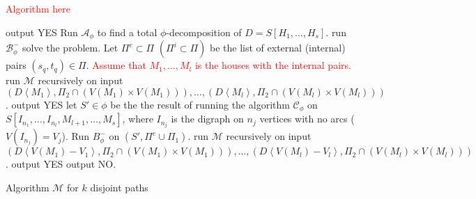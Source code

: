 \textcolor{red}{Algorithm here}
\begin{algorithm}
    \begin{algorithmic}[1]
        \IF{$\Pi=\emptyset$}
            \STATE output YES
        \ENDIF
        \STATE Run $\mathcal{A}_{\phi}$ to find a total $\phi$-decomposition of $D=S[H_1,\dots,H_s]$.
            \STATE run $\mathcal{B}^-_{\phi}$ solve the problem.
        \ENDIF
        \STATE Let $\Pi^e\subset \Pi$ $(\Pi^i\subset \Pi)$ be the list of external (internal) pairs $(s_q,t_q)\in \Pi$.
        \STATE \textcolor{red}{Assume that $M_1,\dots , M_l$ is the houses with the internal pairs.}
             \label{state 3a}
                \STATE run $\mathcal{M}$ recursively on input $(D\left<M_1\right>, \Pi_2\cap (V(M_1)\times V(M_1))) , \dots ,(D\left<M_l\right>, \Pi_2\cap (V(M_l)\times V(M_l)))$.
                    \STATE output YES
                \ENDIF
            \ENDIF
             \label{state 3b}
                    \STATE let $S'\in \phi$ be the the result of running the algorithm $\mathcal{C}_\phi$ on $S[I_{n_1},\dots,I_{n_l},M_{l+1},\dots , M_s]$, where $I_{n_j}$ is the digraph on $n_j$ vertices with no arcs ($V(I_{n_j})=V_j$).            
                    \STATE Run $B_{\phi}^-$ on $(S',\Pi^e\cup\Pi_1)$.
                        \STATE run $\mathcal{M}$ recursively on input $(D\left<V(M_1)-V_1\right>, \Pi_2\cap (V(M_1)\times V(M_1))) , \dots ,(D\left<V(M_l)-V_l\right>, \Pi_2\cap (V(M_l)\times V(M_l)))$.
                    \ENDIF 
                        \STATE output YES
                    \ENDIF
                \ENDFOR
            \ENDIF
        \ENDFOR 
            \STATE output NO.
        \ENDIF
    \end{algorithmic}
    \caption{Algorithm $\mathcal{M}$ for $k$ disjoint paths}
\end{algorithm}
